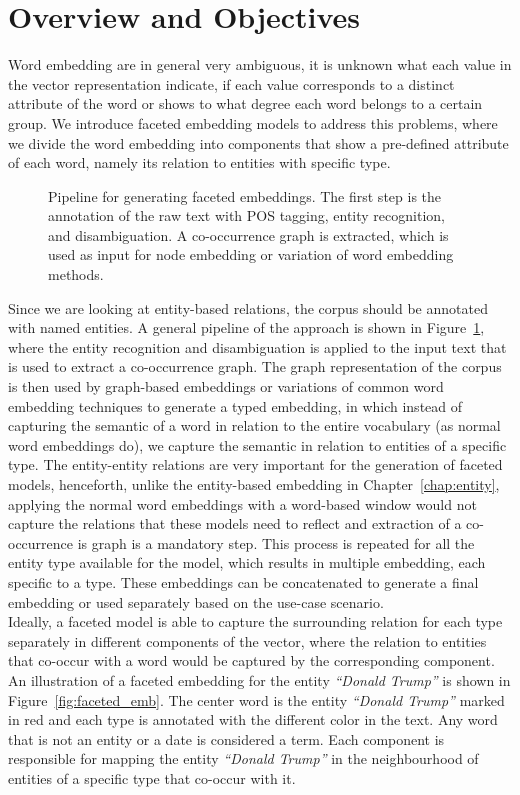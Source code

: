 \section{Overview and Objectives}\label{sec:faceted_overview}
Word embedding are in general very ambiguous, it is unknown what each value in the vector representation indicate, if each value corresponds to a distinct attribute of the word or shows to what degree each word belongs to a certain group. We introduce faceted embedding models to address this problems, where we divide the word embedding into components that show a pre-defined attribute of each word, namely its relation to entities with specific type. 
\begin{figure}
\centering 
\resizebox{0.97\textwidth}{0.16\textwidth}{      

}
\caption{Pipeline for generating faceted embeddings. The first step is the annotation of the raw text with POS tagging, entity recognition, and disambiguation. A co-occurrence graph is extracted, which is used as input for node embedding or variation of word embedding methods.   }
\label{fig:facetted_pipeline}
\end{figure}
Since we are looking at entity-based relations, the corpus should be annotated with named entities. A general pipeline of the approach is shown in Figure~\ref{fig:facetted_pipeline}, where the entity recognition and disambiguation is applied to the input text that  is used to extract a co-occurrence graph. The graph representation of the corpus is then used by graph-based embeddings or variations of common word embedding techniques to generate a typed embedding, in which instead of capturing the semantic of a word in relation to the entire vocabulary (as normal word embeddings do), we capture the semantic in relation to entities of a specific type. The entity-entity relations are very important for the generation of faceted models, henceforth, unlike the entity-based embedding in Chapter~\ref{chap:entity}, applying the normal word embeddings with a word-based window would not capture the relations that these models need to reflect and extraction of a co-occurrence is graph is a mandatory step. This process is repeated for all the entity type available for the model, which results in multiple embedding, each specific to a type. These embeddings can be concatenated to generate a final embedding or used separately based on the use-case scenario. \\
Ideally, a faceted model is able to capture the surrounding relation for each type separately in different components of the vector, where the relation to entities that co-occur with a word would be captured by the corresponding component. An illustration of a faceted embedding for the entity \emph{``Donald Trump''} is shown in Figure~\ref{fig:faceted_emb}. The center word is the entity \emph{``Donald Trump''} marked in red and each type is annotated with the different color in the text. Any word that is not an entity or a date is considered a term. Each component is responsible for mapping the entity \emph{``Donald Trump''} in the neighbourhood of entities of a specific type that co-occur with it. \\
